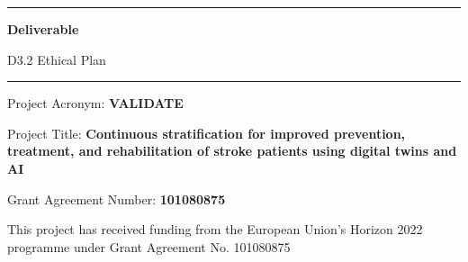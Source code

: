 \begin{center}
\end{center}

\hrule
\vspace{0.2cm}

\begin{center}
\huge \textbf{Deliverable}
\end{center}

\begin{center}
\Large D3.2 Ethical Plan
\end{center}

\vspace{0.2cm}
\hrule

\vspace{0.2cm}

\large \noindent Project Acronym: \textbf{VALIDATE}  

\vspace{0.2cm}

\large \noindent Project Title: \textbf{Continuous stratification for improved prevention, treatment, and rehabilitation of stroke patients using digital twins and AI}  

\vspace{0.2cm}

\large \noindent Grant Agreement Number: \textbf{101080875} 

\vspace{0.2cm}


\noindent \newline \newline \small This project has received funding from the European Union’s Horizon 2022 programme under Grant Agreement No. 101080875

\vspace{0.2cm}

